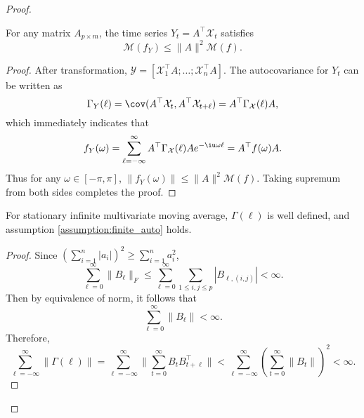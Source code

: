 \begin{proof}
\begin{lem}
\label{lemma:max-L2-norm-Y}
For any matrix $A_{p\times m}$, the time series $Y_t = A^\top \mathcal{X}_t$ satisfies
\begin{equation}
\mathcal{M}(f_Y) \le \|A\|^2 \mathcal{M}(f).
\end{equation}
\begin{proof}
After transformation, $\mathcal{Y} = [\mathcal{X}_1^\top A; \dots; \mathcal{X}_n^\top A]$. The autocovariance for $Y_t$ can be written as 
\begin{equation}
    \Gamma_Y(\ell) = \cov(A^\top \mathcal{X}_t, A^\top \mathcal{X}_{t+\ell}) = A^\top \Gamma_\mathcal{X}(\ell) A,
\end{equation}
which immediately indicates that 
\begin{equation}
f_Y(\omega) = \sum_{\ell=-\infty}^\infty A^\top \Gamma_\mathcal{X}(\ell)A e^{-\iu\omega\ell} = A^\top  f(\omega)A.
\end{equation}
Thus for any $\omega \in [-\pi, \pi]$, $\|f_Y(\omega)\| \le \|A\|^2\mathcal{M}(f)$. Taking supremum from both sides completes the proof. 
\end{proof}
\end{lem}







\begin{lem}
\label{lemma:linear_assumption}
For stationary infinite multivariate moving average, $\Gamma(\ell)$ is well defined, and assumption \ref{assumption:finite_auto} holds.
\begin{proof}
Since $(\sum_{i=1}^n |a_i|)^2 \ge \sum_{i=1}^n a_i^2$, 
\begin{equation}
\sum_{\ell=0}^\infty \|B_\ell\|_F \le \sum_{\ell=0}^\infty \sum_{1\le i,j\le p} |B_{\ell, (i,j)}|<\infty.
\end{equation}
Then by equivalence of norm, it follows that
\begin{equation}
\sum_{\ell=0}^\infty \|B_\ell\| < \infty.
\end{equation}
Therefore, 
\begin{equation}
\label{eq:finite_sum_auto}
\sum_{\ell = -\infty}^\infty \|\Gamma(\ell)\| = \sum_{\ell = -\infty}^\infty \|\sum_{t=0}^\infty B_t B_{t+\ell}^\top \|<
\sum_{\ell = -\infty}^\infty (\sum_{t=0}^\infty \|B_t\|)^2<\infty.
\end{equation}
\end{proof}
\end{lem}



\end{proof}
